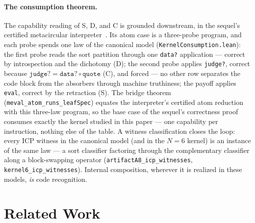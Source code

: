 \documentclass[sigconf,screen]{acmart}
\theoremstyle{remark}
\begin{document}
\paragraph{The consumption theorem.} The capability reading of S, D,
and C is grounded downstream, in the sequel's certified metacircular
interpreter~\cite{companion-pearl}. Its atom case is a three-probe
program, and each probe spends one law of the canonical model
(\texttt{KernelConsumption.lean}): the first probe reads the sort
partition through one \texttt{data?} application --- correct by
introspection and the dichotomy (D); the second probe applies
\texttt{judge?}, correct because
$\texttt{judge?} = \texttt{data?} \circ \texttt{quote}$ (C), and
forced --- no other row separates the code block from the absorbers
through machine truthiness; the payoff applies \texttt{eval}, correct
by the retraction (S). The bridge theorem
(\texttt{meval\_atom\_runs\_leafSpec}) equates the interpreter's
certified atom reduction with this three-law program, so the base
case of the sequel's correctness proof consumes exactly the kernel
studied in this paper --- one capability per instruction, nothing
else of the table. A witness classification closes the loop: every
ICP witness in the canonical model (and in the $N\!=\!6$ kernel) is
an instance of the same law --- a sort classifier factoring through
the complementary classifier along a block-swapping operator
(\texttt{artifactA8\_icp\_witnesses},
\texttt{kernel6\_icp\_witnesses}). Internal composition, wherever it
is realized in these models, \emph{is} code recognition.

\section{Related Work}
\label{sec:related}
\end{document}
